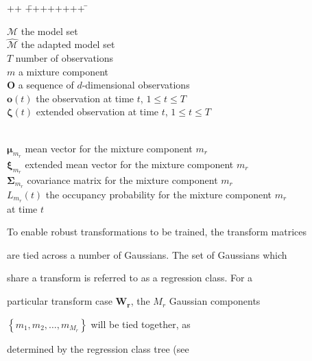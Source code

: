 \begin{tabbing}


++ \= ++++++++ \= \kill


\> $\mathcal{M}$ \> the model set\\


\> $\hat{\mathcal{M}}$ \> the adapted model set\\


\> $T$ \> number of observations \\


\> $m$ \> a mixture component \\


\> $\bm{O}$      \> a sequence of $d$-dimensional observations \\


\> $\bm{o}(t)$    \> the observation at time $t$, $1 \leq t \leq T $\\


\> $\bm{\zeta}(t)$\> extended observation at time $t$, $1 \leq t \leq T $


\\


\> $\bm{\mu}_{m_r}$  \> mean vector for the mixture component $m_r$\\


\> $\bm{\xi}_{m_r}$  \> extended mean vector for the mixture component $m_r$\\


\> $\bm{\Sigma}_{m_r}$  \> covariance matrix for the mixture component $m_r$ \\


\> $L_{m_r}(t)$ \> the occupancy probability for the mixture component $m_r$\\


\>              \>   at time $t$        


\end{tabbing}





To enable robust transformations to be trained, the transform matrices


are tied across a number of Gaussians. The set of Gaussians which


share a transform is referred to as a regression class.  For a


particular transform case $\bm{W_r}$, the $M_r$ Gaussian components


$\left\{m_1, m_2, \dots, m_{M_r}\right\}$ will be tied together, as


determined by the regression class tree (see


